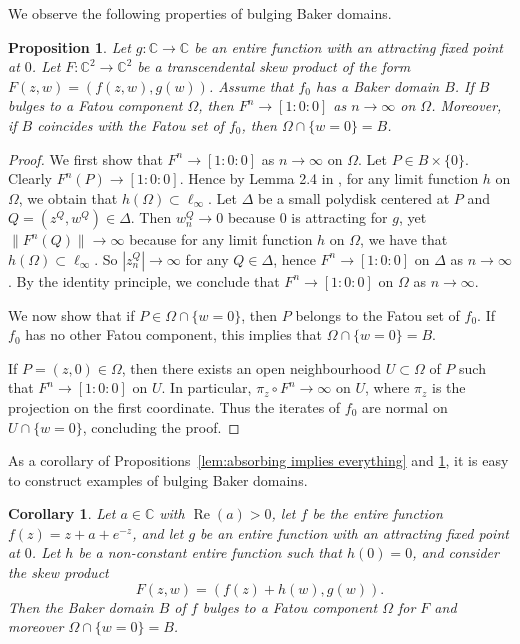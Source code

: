 \documentclass[a4paper, 12pt, twoside]{amsart}
\newtheorem{cor}[thm]{Corollary}
\newtheorem{prop}[thm]{Proposition}
\theoremstyle{definition}
\numberwithin{equation}{section}
\renewcommand{\Re}{\operatorname{Re}}
\newcommand{\C}{{\mathbb C}}
\newcommand{\ra}{\rightarrow}
\begin{document}
We observe the following properties of bulging Baker domains. 

\begin{prop}\label{prop: properties Baker}
Let $g\colon\C\to\C$ be an entire function with an attracting fixed point  at $0$. Let $F \colon \mathbb{C}^2 \to \mathbb{C}^2$ be a transcendental skew product of the form $F(z,w)=(f(z,w),g(w))$. Assume that $f_0$ has a Baker domain $B$. If $B$ bulges to a Fatou component $\Omega$,  then  $F^n\ra[1:0:0]$ as $n\ra\infty$ on $\Omega$.  Moreover, if $B$ coincides with the Fatou set of $f_0$,  then  $\Omega\cap \{w=0\}=B$.
\end{prop}
\begin{proof}
 We first show that $F^n\ra[1:0:0]$ as $n\ra\infty$ on $\Omega$.  Let $P\in B\times \{0\}$. Clearly  $F^n(P)\ra[1:0:0]$.  Hence by Lemma 2.4 in \cite{ABFP2019}, for any   limit function $h$ on $\Omega$, we obtain that $h(\Omega)\subset\ell_\infty$.  Let $\Delta$ be a small polydisk centered at  $P$ and $Q=(z^Q,w^Q)\in \Delta$. Then $w^Q_n\ra0$ because   $0$ is attracting for $g$, yet $\|F^n(Q)\|\ra\infty$ because for any   limit function $h$ on $\Omega$, we have that $h(\Omega)\subset\ell_\infty$. So $|z^Q_n|\ra\infty$ for any $Q\in \Delta$, hence  $F^n\ra[1:0:0]$ on $\Delta $ as $n\ra\infty$. By the identity principle, we conclude that $F^n\ra[1:0:0]$ on $\Omega$ as $n\ra\infty$.
 
We now  show that if $P\in\Omega\cap \{w=0\}$, then $P$ belongs to the Fatou set of $f_0$. If $f_0$ has no other Fatou component,  this implies that $\Omega\cap\{w=0\}=B$. 

If $P=(z,0)\in\Omega$, then there exists an open neighbourhood $U\subset\Omega$ of $P$ such that  $F^n\ra[1:0:0]$ on $U$. In particular, $\pi_z\circ F^n\ra\infty$ on $U$, where  $\pi_z$ is the projection on the first coordinate. Thus the iterates of $f_0$ are  normal on $U\cap\{w=0\}$, concluding the proof.
\end{proof}


As a corollary of Propositions~\ref{lem:absorbing implies everything} and \ref{prop: properties Baker},  it is easy to construct examples of bulging Baker domains.

\begin{cor}\label{cor:bulging Baker domain}
Let $a \in \mathbb{C} $ with $\Re(a) > 0$, let $f$ be the entire function $f(z) = z + a + e^{-z}$, and let $g$ be an entire function with an attracting fixed point at $0$.  Let $h$ be a non-constant entire function such that $h(0)=0$, and consider  the skew product
\begin{equation*}
		 F(z,w) = (f(z) + h(w), g(w)).
	\end{equation*}
	Then  the Baker domain  $B$ of $f$ bulges to a Fatou component $\Omega$ for $F$ and moreover $\Omega\cap\{w=0\}=B$.
\end{cor}
\end{document}
